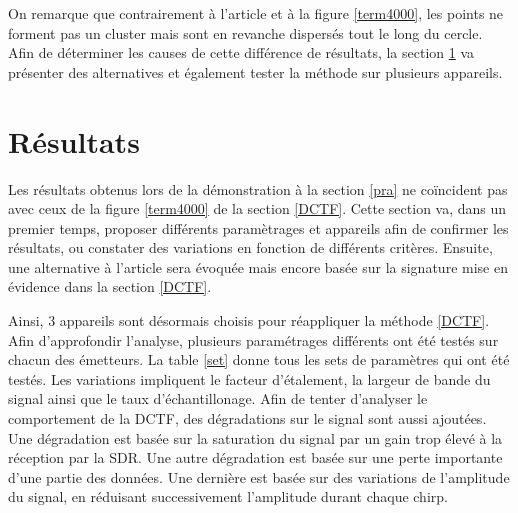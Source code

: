 On remarque que contrairement à l'article et à la figure \ref{term4000}, les points ne forment pas un cluster mais sont en revanche dispersés tout le long du cercle. Afin de déterminer les causes de cette différence de résultats, la section \ref{result} va présenter des alternatives et également tester la méthode sur plusieurs appareils.

\section{Résultats}\label{result}

Les résultats obtenus lors de la démonstration à la section  \ref{pra} ne coïncident pas avec ceux de la figure \ref{term4000} de la section \ref{DCTF}. Cette section va, dans un premier temps, proposer différents paramètrages et appareils afin de confirmer les résultats, ou constater des variations en fonction de différents critères. Ensuite, une alternative à l'article sera évoquée mais encore basée sur la signature mise en évidence dans la section \ref{DCTF}. 

Ainsi, 3 appareils sont désormais choisis pour réappliquer la méthode \ref{DCTF}. Afin d'approfondir l'analyse, plusieurs paramétrages différents ont été testés sur chacun des émetteurs. La table \ref{set} donne tous les sets de paramètres qui ont été testés. Les variations impliquent le facteur d'étalement, la largeur de bande du signal ainsi que le taux d'échantillonage. Afin de tenter d'analyser le comportement de la \ac{DCTF}, des dégradations sur le signal sont aussi ajoutées. Une dégradation est basée sur la saturation du signal par un gain trop élevé à la réception par la \ac{SDR}. Une autre dégradation est basée sur une perte importante d'une partie des données. Une dernière est basée sur des variations de l'amplitude du signal, en réduisant successivement l'amplitude durant chaque chirp.

